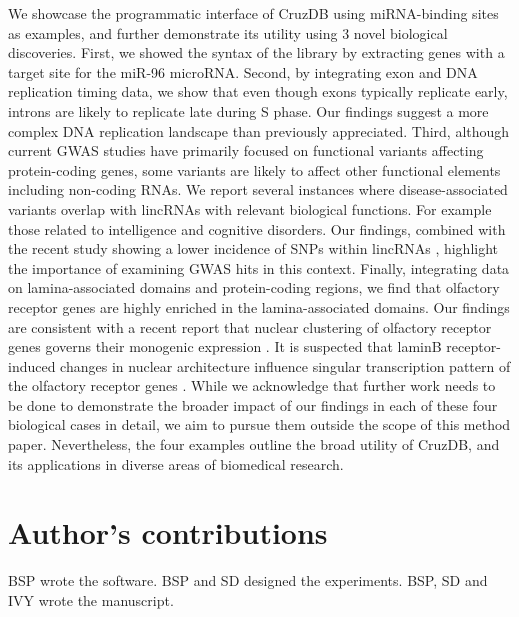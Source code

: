 \documentclass[10pt]{bmc_article}
\newenvironment{bmcformat}{\baselineskip20pt\sloppy\setboolean{publ}{false}}{\baselineskip20pt\sloppy}
\begin{document}
\begin{bmcformat}
We showcase the programmatic interface of CruzDB using miRNA-binding sites as examples, and further demonstrate its utility using 3 novel biological discoveries.
First, we showed the syntax of the library by extracting genes with a target site for the miR-96 microRNA. 
Second, by integrating exon and DNA replication timing data, we show that even though exons typically replicate early, introns are likely to replicate late during S phase. 
Our findings suggest a more complex DNA replication landscape than previously appreciated. 
Third, although current GWAS studies have primarily focused on functional variants affecting protein-coding genes, some variants are likely to affect other functional elements including non-coding RNAs. 
We report several instances where disease-associated variants overlap with lincRNAs with relevant biological functions. 
For example those related to intelligence and cognitive disorders. 
Our findings, combined with the recent study showing a lower incidence of SNPs within lincRNAs \cite{Chen}, highlight the importance of examining GWAS hits in this context. 
Finally, integrating data on lamina-associated domains and protein-coding regions, we find that olfactory receptor genes are highly enriched in the lamina-associated domains. Our findings are consistent with a recent report that nuclear clustering of olfactory receptor genes governs their monogenic expression \cite{Clowney}. It is suspected that laminB receptor-induced changes in nuclear architecture influence singular transcription pattern of the olfactory receptor genes \cite{Clowney}. While we acknowledge that further work needs to be done to demonstrate the broader impact of our findings in each of these four biological cases in detail, we aim to pursue them outside the scope of this method paper. Nevertheless, the four examples outline the broad utility of CruzDB, and its applications in diverse areas of biomedical research. 



\bigskip

\section*{Author's contributions}
BSP wrote the software. BSP and SD designed the experiments. BSP, SD and IVY wrote the manuscript.
    


\end{bmcformat}
\end{document}
